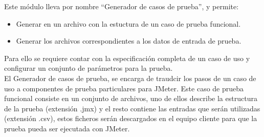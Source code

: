 	Este módulo lleva por nombre ``Generador de casos de prueba'', y permite: 
	
	\begin{itemize}
		\item Generar en un archivo con la estuctura de un caso de prueba funcional.
		\item Generar los archivos correspondientes a los datos de entrada de prueba.
		
	\end{itemize}
	Para  ello se requiere contar con la especificación completa de un caso de uso y configurar un conjunto de parámetros para la prueba.\\

	El Generador de casos de prueba, se encarga de traudcir los pasos de un caso de uso a componentes de prueba particulares para JMeter. Este caso de prueba funcional consiste en un conjunto de archivos, uno de ellos describe la estructura de la prueba (extensión .jmx) y el resto contiene las entradas que serán utilizadas (extensión .csv), estos ficheros serán descargados en el equipo cliente para que la prueba pueda ser ejecutada con JMeter.\\\\
